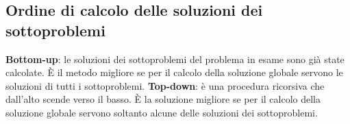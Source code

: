 \subsection{Ordine di calcolo delle soluzioni dei sottoproblemi}

\textbf{Bottom-up}: le soluzioni dei sottoproblemi del problema in esame sono già state calcolate. È il metodo migliore se per il calcolo della soluzione globale servono le soluzioni di tutti i sottoproblemi.
\linebreak
\linebreak
\textbf{Top-down}: è una procedura ricorsiva che dall'alto scende verso il basso. È la soluzione migliore se per il calcolo della soluzione globale servono soltanto alcune delle soluzioni dei sottoproblemi.